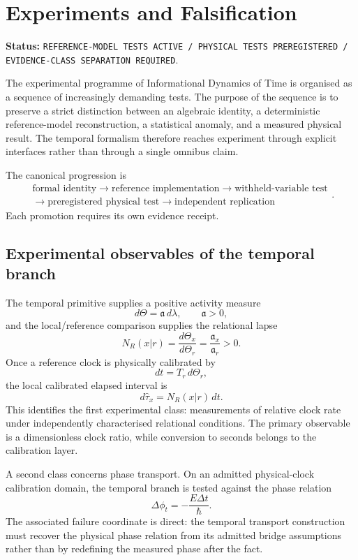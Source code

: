 \documentclass[11pt]{book}
\begin{document}
\chapter{Experiments and Falsification}

\noindent\textbf{Status:} \texttt{REFERENCE-MODEL TESTS ACTIVE / PHYSICAL TESTS PREREGISTERED / EVIDENCE-CLASS SEPARATION REQUIRED}.

The experimental programme of Informational Dynamics of Time is organised as a sequence of increasingly demanding tests. The purpose of the sequence is to preserve a strict distinction between an algebraic identity, a deterministic reference-model reconstruction, a statistical anomaly, and a measured physical result. The temporal formalism therefore reaches experiment through explicit interfaces rather than through a single omnibus claim.

The canonical progression is
\[
\boxed{
\begin{gathered}
\text{formal identity}
\longrightarrow
\text{reference implementation}
\longrightarrow
\text{withheld-variable test}
\\
{}\longrightarrow
\text{preregistered physical test}
\longrightarrow
\text{independent replication}
\end{gathered}
}.
\]
Each promotion requires its own evidence receipt.

\section{Experimental observables of the temporal branch}

The temporal primitive supplies a positive activity measure
\[
d\Theta=\mathfrak a\,d\lambda,
\qquad \mathfrak a>0,
\]
and the local/reference comparison supplies the relational lapse
\[
N_R(x|r)=\frac{d\Theta_x}{d\Theta_r}
=\frac{\mathfrak a_x}{\mathfrak a_r}>0.
\]
Once a reference clock is physically calibrated by
\[
dt=T_r\,d\Theta_r,
\]
the local calibrated elapsed interval is
\[
d\widehat\tau_x=N_R(x|r)\,dt.
\]
This identifies the first experimental class: measurements of relative clock rate under independently characterised relational conditions. The primary observable is a dimensionless clock ratio, while conversion to seconds belongs to the calibration layer.

A second class concerns phase transport. On an admitted physical-clock calibration domain, the temporal branch is tested against the phase relation
\[
\Delta\phi_t=-\frac{E\Delta t}{\hbar}.
\]
The associated failure coordinate is direct: the temporal transport construction must recover the physical phase relation from its admitted bridge assumptions rather than by redefining the measured phase after the fact.
\end{document}
